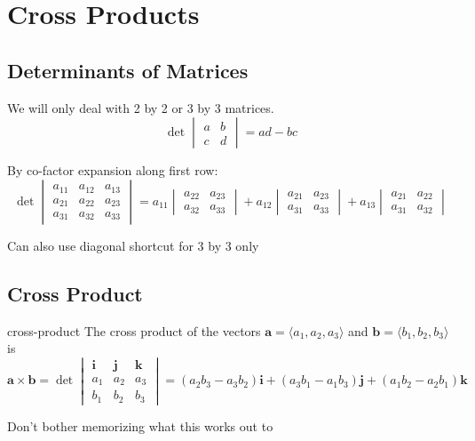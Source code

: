 \documentclass[letterpaper, 11pt, openany]{book}
\theoremstyle{mytheoremstyle}
\theoremstyle{myexamplestyle}
\begin{document}
\section{Cross Products}
\setcounter{figure}{0}
\subsection{Determinants of Matrices}
We will only deal with 2 by 2 or 3 by 3 matrices.
\[\det
\begin{vmatrix}
    a & b\\
    c & d
\end{vmatrix} = ad - bc\]

By co-factor expansion along first row:
\[\det
\begin{vmatrix}
    a_{11} & a_{12} & a_{13}\\
    a_{21} & a_{22} & a_{23}\\
    a_{31} & a_{32} & a_{33}
\end{vmatrix} = a_{11} \begin{vmatrix} a_{22} & a_{23}\\a_{32} & a_{33}\end{vmatrix} + a_{12} \begin{vmatrix} a_{21} & a_{23}\\a_{31} & a_{33}\end{vmatrix} + a_{13} \begin{vmatrix} a_{21} & a_{22}\\a_{31} & a_{32}\end{vmatrix}\]

Can also use diagonal shortcut for 3 by 3 only

\subsection{Cross Product}
\begin{definition}{}{cross-product}
    The cross product of the vectors \(\mathbf{a} = \langle a_1, a_2, a_3\rangle\) and \(\mathbf{b} = \langle b_1, b_2, b_3\rangle\) is
    \[\mathbf{a} \times \mathbf{b} = \det \begin{vmatrix}
        \mathbf{i} &\mathbf{j} &\mathbf{k}\\
        a_1& a_2& a_3\\
        b_1& b_2& b_3
    \end{vmatrix} = (a_2 b_3-a_3 b_2) \mathbf{i} + (a_3 b_1-a_1 b_3) \mathbf{j} + (a_1 b_2-a_2 b_1)\mathbf{k}\]
\end{definition}
Don't bother memorizing what this works out to \faMeh
\end{document}
